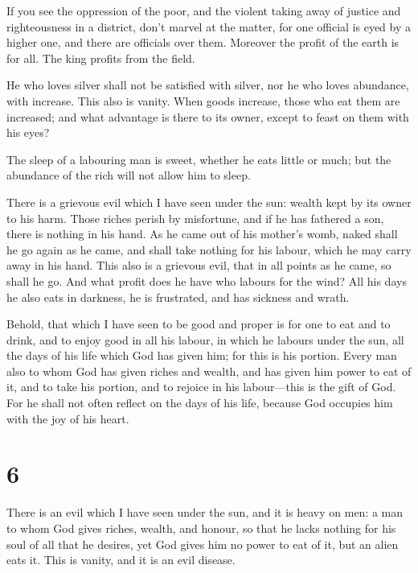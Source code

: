  If you see the oppression of the poor, and the violent
taking away of justice and righteousness in a district, don't marvel at
the matter, for one official is eyed by a higher one, and there are
officials over them.  Moreover the profit of the earth is
for all. The king profits from the field.

 He who loves silver shall not be satisfied with silver,
nor he who loves abundance, with increase. This also is vanity.
 When goods increase, those who eat them are increased;
and what advantage is there to its owner, except to feast on them with
his eyes?

 The sleep of a labouring man is sweet, whether he eats
little or much; but the abundance of the rich will not allow him to
sleep.

 There is a grievous evil which I have seen under the
sun: wealth kept by its owner to his harm.  Those riches
perish by misfortune, and if he has fathered a son, there is nothing in
his hand.  As he came out of his mother's womb, naked
shall he go again as he came, and shall take nothing for his labour,
which he may carry away in his hand.  This also is a
grievous evil, that in all points as he came, so shall he go. And what
profit does he have who labours for the wind?  All his
days he also eats in darkness, he is frustrated, and has sickness and
wrath.

 Behold, that which I have seen to be good and proper is
for one to eat and to drink, and to enjoy good in all his labour, in
which he labours under the sun, all the days of his life which God has
given him; for this is his portion.  Every man also to
whom God has given riches and wealth, and has given him power to eat of
it, and to take his portion, and to rejoice in his labour---this is the
gift of God.  For he shall not often reflect on the days
of his life, because God occupies him with the joy of his heart.

\hypertarget{section-5}{%
\section{6}\label{section-5}}

 There is an evil which I have seen under the sun, and it
is heavy on men:  a man to whom God gives riches, wealth,
and honour, so that he lacks nothing for his soul of all that he
desires, yet God gives him no power to eat of it, but an alien eats it.
This is vanity, and it is an evil disease.

